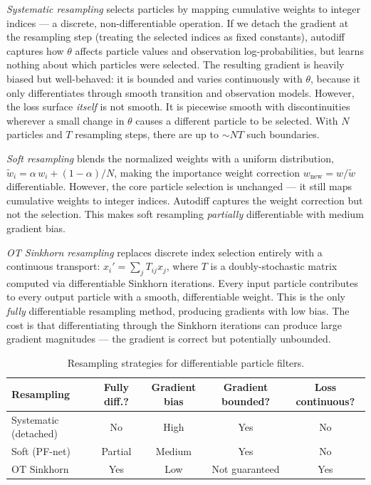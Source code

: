 \documentclass{article}
\begin{document}
\textit{Systematic resampling} selects particles by mapping cumulative weights to integer indices --- a discrete, non-differentiable operation. If we detach the gradient at the resampling step (treating the selected indices as fixed constants), autodiff captures how $\theta$ affects particle values and observation log-probabilities, but learns nothing about which particles were selected. The resulting gradient is heavily biased but well-behaved: it is bounded and varies continuously with $\theta$, because it only differentiates through smooth transition and observation models. However, the loss surface \textit{itself} is not smooth. It is piecewise smooth with discontinuities wherever a small change in $\theta$ causes a different particle to be selected. With $N$ particles and $T$ resampling steps, there are up to $\sim NT$ such boundaries.

\textit{Soft resampling}\cite{karkus2018particle} blends the normalized weights with a uniform distribution, $\tilde{w}_i = \alpha \, w_i + (1-\alpha)/N$, making the importance weight correction $w_{\text{new}} = w / \tilde{w}$ differentiable. However, the core particle selection is unchanged --- it still maps cumulative weights to integer indices. Autodiff captures the weight correction but not the selection. This makes soft resampling \textit{partially} differentiable with medium gradient bias.

\textit{OT Sinkhorn resampling}\cite{corenflos-differentiable-2021} replaces discrete index selection entirely with a continuous transport: $x_i' = \sum_j T_{ij} x_j$, where $T$ is a doubly-stochastic matrix computed via differentiable Sinkhorn iterations. Every input particle contributes to every output particle with a smooth, differentiable weight. This is the only \textit{fully} differentiable resampling method, producing gradients with low bias. The cost is that differentiating through the Sinkhorn iterations can produce large gradient magnitudes --- the gradient is correct but potentially unbounded.

\begin{table}[H]
\centering
\caption{Resampling strategies for differentiable particle filters.}
\label{tab:resampling_grad}
\begin{tabular}{lcccc}
\toprule
Resampling & Fully diff.? & Gradient bias & Gradient bounded? & Loss continuous? \\
\midrule
Systematic (detached) & No & High & Yes & No \\
Soft (PF-net) & Partial & Medium & Yes & No \\
OT Sinkhorn & Yes & Low & Not guaranteed & Yes \\
\bottomrule
\end{tabular}
\end{table}
\end{document}
